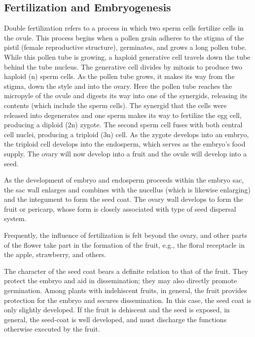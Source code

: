 \hypertarget{fertilization-and-embryogenesis}{%
\subsection{Fertilization and Embryogenesis}\label{fertilization-and-embryogenesis}}

Double fertilization refers to a process in which two sperm cells fertilize cells in the ovule. This process begins when a pollen grain adheres to the stigma of the pistil (female reproductive structure), germinates, and grows a long pollen tube. While this pollen tube is growing, a haploid generative cell travels down the tube behind the tube nucleus. The generative cell divides by mitosis to produce two haploid (n) sperm cells. As the pollen tube grows, it makes its way from the stigma, down the style and into the ovary. Here the pollen tube reaches the micropyle of the ovule and digests its way into one of the synergids, releasing its contents (which include the sperm cells). The synergid that the cells were released into degenerates and one sperm makes its way to fertilize the egg cell, producing a diploid (2n) zygote. The second sperm cell fuses with both central cell nuclei, producing a triploid (3n) cell. As the zygote develops into an embryo, the triploid cell develops into the endosperm, which serves as the embryo's food supply. The ovary will now develop into a fruit and the ovule will develop into a seed.

As the development of embryo and endosperm proceeds within the embryo sac, the sac wall enlarges and combines with the nucellus (which is likewise enlarging) and the integument to form the seed coat. The ovary wall develops to form the fruit or pericarp, whose form is closely associated with type of seed dispersal system.

Frequently, the influence of fertilization is felt beyond the ovary, and other parts of the flower take part in the formation of the fruit, e.g., the floral receptacle in the apple, strawberry, and others.

The character of the seed coat bears a definite relation to that of the fruit. They protect the embryo and aid in dissemination; they may also directly promote germination. Among plants with indehiscent fruits, in general, the fruit provides protection for the embryo and secures dissemination. In this case, the seed coat is only slightly developed. If the fruit is dehiscent and the seed is exposed, in general, the seed-coat is well developed, and must discharge the functions otherwise executed by the fruit.

